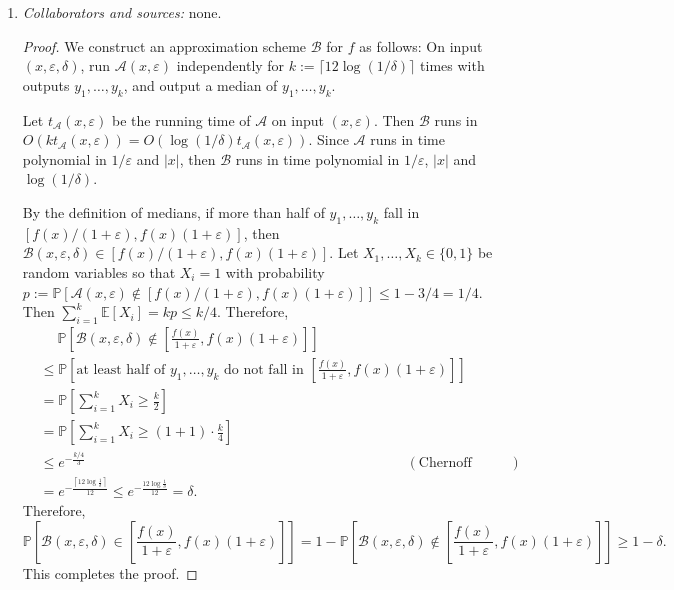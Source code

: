 \documentclass[letterpaper, reqno,11pt]{article}
\newcommand{\PP}{\mathbb{P}}
\newcommand{\EE}{\mathbb{E}}
\begin{document}
\begin{enumerate}
  \item \noindent\emph{Collaborators and sources:} none.

  \bigskip

  \begin{proof}
    We construct an approximation scheme $\mathcal B$ for $f$ as follows: On input $(x, \varepsilon, \delta)$, run $\mathcal A(x, \varepsilon)$ independently for $k := \lceil 12\log (1/\delta) \rceil$ times with outputs $y_1, \ldots, y_k$, and output a median of $y_1, \ldots, y_k$.
    
    Let $t_{\mathcal A}(x, \varepsilon)$ be the running time of $\mathcal A$ on input $(x, \varepsilon)$. Then $\mathcal B$ runs in $O(kt_{\mathcal A}(x, \varepsilon)) = O(\log(1/\delta) t_{\mathcal A}(x, \varepsilon))$. Since $\mathcal A$ runs in time polynomial in $1/\varepsilon$ and $|x|$, then $\mathcal B$ runs in time polynomial in $1/\varepsilon$, $|x|$ and $\log(1/\delta)$.

    By the definition of medians, if more than half of $y_1, \ldots, y_k$ fall in $[f(x)/(1 + \varepsilon), f(x)(1 + \varepsilon)]$, then $\mathcal B(x, \varepsilon, \delta) \in [f(x)/(1 + \varepsilon), f(x)(1 + \varepsilon)]$. Let $X_1, \ldots, X_k \in \{ 0, 1 \}$ be random variables so that $X_i = 1$ with probability $p := \PP[\mathcal A(x, \varepsilon) \not \in [f(x)/(1 + \varepsilon), f(x)(1 + \varepsilon)]] \leq 1 - 3/4 = 1/4$. Then $\sum_{i = 1}^k \EE[X_i] = kp \leq k/4$. Therefore,
    \begin{align*}
      &\quad\; \PP\left[\mathcal B(x, \varepsilon, \delta) \not \in \left[\frac{f(x)}{1 + \varepsilon}, f(x)(1 + \varepsilon)\right]\right] \\
      &\leq \PP\left[\text{at least half of $y_1, \ldots, y_k$ do not fall in $\left[\frac{f(x)}{1 + \varepsilon}, f(x)(1 + \varepsilon)\right]$}\right] \\
      &= \PP\left[\sum_{i = 1}^k X_i \geq \frac{k}{2}\right] \\
      &= \PP\left[\sum_{i = 1}^k X_i \geq (1 + 1) \cdot \frac{k}{4}\right] \\
      &\leq e^{-\frac{k/4}{3}} && (\text{Chernoff bound}) \\
      &= e^{-\frac{\left\lceil 12\log \frac{1}{\delta} \right\rceil}{12}} \leq e^{-\frac{12\log \frac{1}{\delta}}{12}} = \delta.
    \end{align*}
    Therefore,
    $$ \PP\left[\mathcal B(x, \varepsilon, \delta) \in \left[\frac{f(x)}{1 + \varepsilon}, f(x)(1 + \varepsilon)\right]\right] = 1 - \PP\left[\mathcal B(x, \varepsilon, \delta) \not \in \left[\frac{f(x)}{1 + \varepsilon}, f(x)(1 + \varepsilon)\right]\right] \geq 1 - \delta. $$
    This completes the proof.
  \end{proof}


\end{enumerate}
\end{document}
